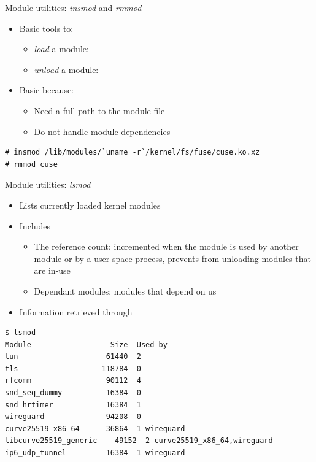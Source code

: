 \begin{frame}[fragile]{Module utilities: {\em insmod} and {\em rmmod}}
  \begin{itemize}
  \item Basic tools to:
    \begin{itemize}
    \item {\em load} a module: 
    \item {\em unload} a module: 
    \end{itemize}
  \item Basic because:
    \begin{itemize}
    \item Need a full path to the module  file
    \item Do not handle module dependencies
    \end{itemize}
  \end{itemize}

  \begin{block}{}
    {\footnotesize
\begin{verbatim}
# insmod /lib/modules/`uname -r`/kernel/fs/fuse/cuse.ko.xz
# rmmod cuse
\end{verbatim}
    }
  \end{block}
\end{frame}

\begin{frame}[fragile]{Module utilities: {\em lsmod}}

  \begin{itemize}
  \item Lists currently loaded kernel modules
  \item Includes
    \begin{itemize}
    \item The reference count: incremented when the module is used by
      another module or by a user-space process, prevents from unloading
      modules that are in-use
    \item Dependant modules: modules that depend on us
    \end{itemize}
  \item Information retrieved through 
  \end{itemize}

  \begin{block}{}
    {\footnotesize
\begin{verbatim}
$ lsmod
Module                  Size  Used by
tun                    61440  2
tls                   118784  0
rfcomm                 90112  4
snd_seq_dummy          16384  0
snd_hrtimer            16384  1
wireguard              94208  0
curve25519_x86_64      36864  1 wireguard
libcurve25519_generic    49152  2 curve25519_x86_64,wireguard
ip6_udp_tunnel         16384  1 wireguard
\end{verbatim}
    }
  \end{block}
\end{frame}

